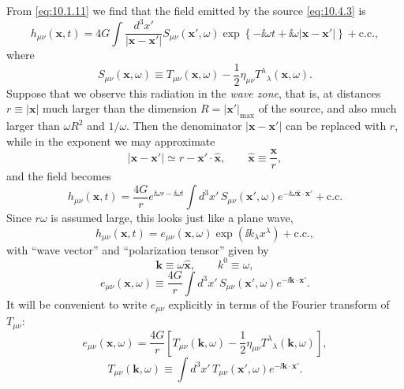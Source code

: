 From \eqref{eq:10.1.11} we find that the field emitted by the source
\eqref{eq:10.4.3} is
\begin{equation}
  h_{\mu\nu}(\mathbf{x},t)
  =
  4G\int\frac{d^3x'}{\lvert\mathbf{x}-\mathbf{x}'\rvert}
  S_{\mu\nu}(\mathbf{x}',\omega)
  \exp\!\left\{-\ii\omega t
  +\ii\omega\lvert\mathbf{x}-\mathbf{x}'\rvert\right\}
  +\text{c.c.},
  \tag{10.4.4}\label{eq:10.4.4}
\end{equation}
where
\begin{equation}
  S_{\mu\nu}(\mathbf{x},\omega)
  \equiv
  T_{\mu\nu}(\mathbf{x},\omega)
  -\frac12\eta_{\mu\nu}T^\lambda{}_\lambda(\mathbf{x},\omega).
  \tag{10.4.5}\label{eq:10.4.5}
\end{equation}
Suppose that we observe this radiation in the \emph{wave zone}, that is, at
distances \(r\equiv\lvert\mathbf{x}\rvert\) much larger than the dimension
\(R=\lvert\mathbf{x}'\rvert_{\max}\) of the source, and also much larger
than \(\omega R^2\) and \(1/\omega\). Then the denominator
\(\lvert\mathbf{x}-\mathbf{x}'\rvert\) can be replaced with \(r\), while
in the exponent we may approximate
\[
  \lvert\mathbf{x}-\mathbf{x}'\rvert
  \simeq r-\mathbf{x}'\cdot\widehat{\mathbf{x}},
  \qquad
  \widehat{\mathbf{x}}\equiv\frac{\mathbf{x}}{r},
\]
and the field becomes
\begin{equation}
  h_{\mu\nu}(\mathbf{x},t)
  =
  \frac{4G}{r}e^{\ii\omega r-\ii\omega t}
  \int d^3x'\,
  S_{\mu\nu}(\mathbf{x}',\omega)
  e^{-\ii\omega\widehat{\mathbf{x}}\cdot\mathbf{x}'}
  +\text{c.c.}
  \tag{10.4.6}\label{eq:10.4.6}
\end{equation}
Since \(r\omega\) is assumed large, this looks just like a plane wave,
\begin{equation}
  h_{\mu\nu}(\mathbf{x},t)
  =
  e_{\mu\nu}(\mathbf{x},\omega)
  \exp(\ii k_\lambda x^\lambda)
  +\text{c.c.},
  \tag{10.4.7}\label{eq:10.4.7}
\end{equation}
with ``wave vector'' and ``polarization tensor'' given by
\begin{equation}
  \mathbf{k}\equiv\omega\widehat{\mathbf{x}},
  \qquad
  k^0\equiv\omega,
  \tag{10.4.8}\label{eq:10.4.8}
\end{equation}
\begin{equation}
  e_{\mu\nu}(\mathbf{x},\omega)
  \equiv
  \frac{4G}{r}\int d^3x'\,
  S_{\mu\nu}(\mathbf{x}',\omega)e^{-\ii\mathbf{k}\cdot\mathbf{x}'}.
  \tag{10.4.9}\label{eq:10.4.9}
\end{equation}
It will be convenient to write \(e_{\mu\nu}\) explicitly in terms of the
Fourier transform of \(T_{\mu\nu}\):
\begin{equation}
  e_{\mu\nu}(\mathbf{x},\omega)
  =
  \frac{4G}{r}
  \left[
    T_{\mu\nu}(\mathbf{k},\omega)
    -\frac12\eta_{\mu\nu}T^\lambda{}_\lambda(\mathbf{k},\omega)
  \right],
  \tag{10.4.10}\label{eq:10.4.10}
\end{equation}
\begin{equation}
  T_{\mu\nu}(\mathbf{k},\omega)
  \equiv
  \int d^3x'\,
  T_{\mu\nu}(\mathbf{x}',\omega)e^{-\ii\mathbf{k}\cdot\mathbf{x}'}.
  \tag{10.4.11}\label{eq:10.4.11}
\end{equation}

